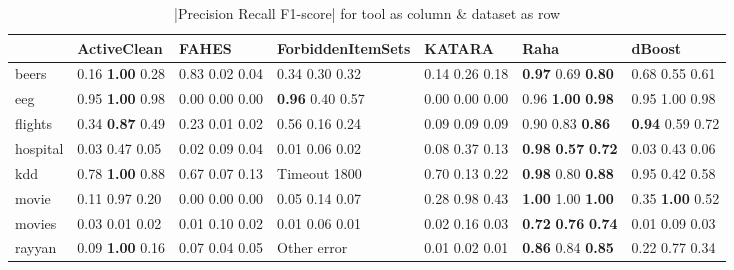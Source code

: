 \begin{table}[h]
\centering
\caption{|Precision Recall F1-score| for tool as column \& dataset as row}
\begin{adjustbox}{center}
\begin{tabular}{lllllll}
\toprule
{} &                 ActiveClean &                               FAHES &           ForbiddenItemSets &              KATARA &                                        Raha &                                      dBoost \\
\midrule
beers       &  0.16  \textbf{1.00} 0.28   &                  0.83  0.02  0.04   &          0.34  0.30  0.32   &  0.14  0.26  0.18   &          \textbf{0.97} 0.69  \textbf{0.80}  &                          0.68  0.55  0.61   \\
eeg         &  0.95  \textbf{1.00} 0.98   &                  0.00  0.00  0.00   &  \textbf{0.96} 0.40  0.57   &  0.00  0.00  0.00   &          0.96  \textbf{1.00} \textbf{0.98}  &                          0.95  1.00  0.98   \\
flights     &  0.34  \textbf{0.87} 0.49   &                  0.23  0.01  0.02   &          0.56  0.16  0.24   &  0.09  0.09  0.09   &                  0.90  0.83  \textbf{0.86}  &                  \textbf{0.94} 0.59  0.72   \\
hospital    &          0.03  0.47  0.05   &                  0.02  0.09  0.04   &          0.01  0.06  0.02   &  0.08  0.37  0.13   &  \textbf{0.98} \textbf{0.57} \textbf{0.72}  &                          0.03  0.43  0.06   \\
kdd         &  0.78  \textbf{1.00} 0.88   &                  0.67  0.07  0.13   &                Timeout 1800 &  0.70  0.13  0.22   &          \textbf{0.98} 0.80  \textbf{0.88}  &                          0.95  0.42  0.58   \\
movie       &          0.11  0.97  0.20   &                  0.00  0.00  0.00   &          0.05  0.14  0.07   &  0.28  0.98  0.43   &          \textbf{1.00} 1.00  \textbf{1.00}  &                  0.35  \textbf{1.00} 0.52   \\
movies      &          0.03  0.01  0.02   &                  0.01  0.10  0.02   &          0.01  0.06  0.01   &  0.02  0.16  0.03   &  \textbf{0.72} \textbf{0.76} \textbf{0.74}  &                          0.01  0.09  0.03   \\
rayyan      &  0.09  \textbf{1.00} 0.16   &                  0.07  0.04  0.05   &                 Other error &  0.01  0.02  0.01   &          \textbf{0.86} 0.84  \textbf{0.85}  &                          0.22  0.77  0.34   \\

\end{tabular}
\end{adjustbox}
\end{table}
